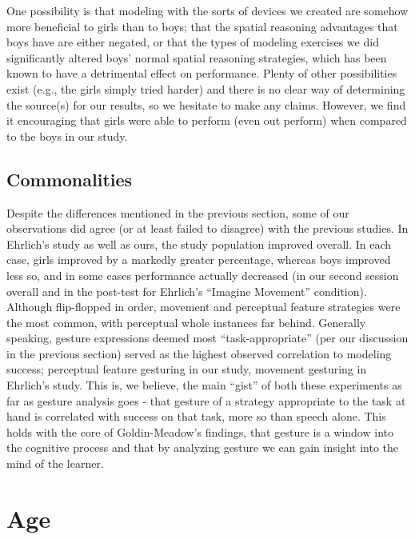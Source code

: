 One possibility is that modeling with the sorts of devices we created are
somehow more beneficial to girls than to boys; that the spatial reasoning
advantages that boys have are either negated, or that the types of modeling
exercises we did significantly altered boys' normal spatial reasoning
strategies, which has been known to have a detrimental effect on
performance\cite{beilock2002paying}\cite{lutz2001procedural}. Plenty of other
possibilities exist (e.g., the girls simply tried harder) and there is no clear
way of determining the source(s) for our results, so we hesitate to make any
claims. However, we find it encouraging that girls were able to perform (even
out perform) when compared to the boys in our study.

\subsection{Commonalities}

Despite the differences mentioned in the previous section, some of our
observations did agree (or at least failed to disagree) with the previous
studies. In Ehrlich's study as well as ours, the study population improved
overall. In each case, girls improved by a markedly greater percentage, whereas
boys improved less so, and in some cases performance actually decreased (in our
second session overall and in the post-test for Ehrlich's ``Imagine Movement''
condition). Although flip-flopped in order, movement and perceptual feature
strategies were the most common, with perceptual whole instances far behind.
Generally speaking, gesture expressions deemed most ``task-appropriate'' (per
our discussion in the previous section) served as the highest observed
correlation to modeling success; perceptual feature gesturing in our study,
movement gesturing in Ehrlich's study. This is, we believe, the main ``gist'' of
both these experiments as far as gesture analysis goes - that gesture of a
strategy appropriate to the task at hand is correlated with success on that
task, more so than speech alone. This holds with the core of Goldin-Meadow's
findings, that gesture is a window into the cognitive process and that by
analyzing gesture we can gain insight into the mind of the learner.


% 


\section{Age}

